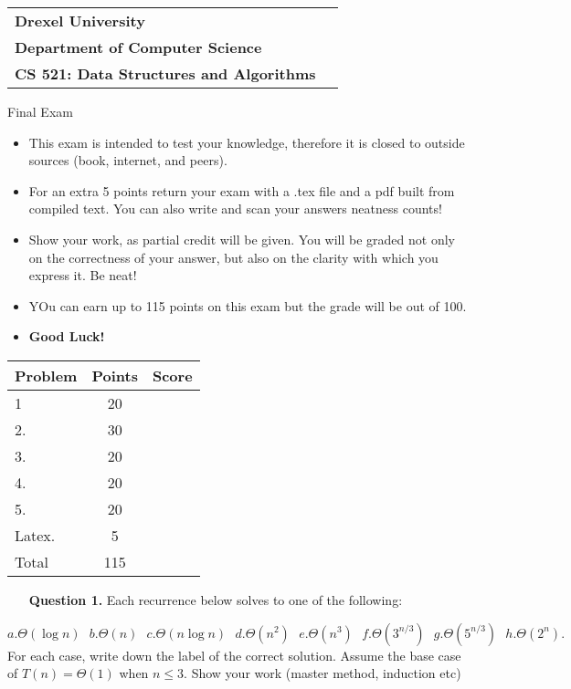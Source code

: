 \documentclass[10pt,letterpaper]{article}
\begin{document}
\begin{tabular}{ll}
{\bf Drexel University}  \\
{\bf Department of Computer Science } \\
{\bf CS 521: Data Structures and Algorithms}& \hspace{1in}{\it Summer 2022} \\
\hline
\end{tabular}
\vspace{0.75 in}
\begin{center}
\begin{LARGE}{Final  Exam} \end{LARGE}
\end{center}
\vspace{0.5in }
\begin{itemize}
\item This exam is intended to test your knowledge, therefore it is closed to outside sources (book, internet, and peers).
\item For an extra 5 points return your exam with a .tex file and a pdf built from compiled text. You can also write and scan your answers neatness counts!
\item Show  your work, as  partial credit will  be given. You  will be
  graded not only on the correctness of your answer, but also on the
  clarity with which you express it. Be neat!
\item YOu can earn up to 115 points on this exam but the grade will be out of 100.
\item {\large \bf Good Luck!}
\end{itemize}
\begin{center}
\begin{tabular}{||l|c|c||}
\hline
\hline
{\sc Problem} & {\sc Points} & {\sc Score}\\
\hline
\hline
{1} & 20 & \\
\hline
{2.} & 30 & \\
\hline
{3.} & 20 & \\
\hline
{4.} & 20 & \\
\hline
{5.} & 20 & \\
\hline
{Latex.} & 5 & \\
\hline
\hline
{\sc Total} & 115 & \\
\hline
\hline
\end{tabular}
\end{center}
\newpage



\begin{itemize}
\item[{\bf Question 1.}] Each recurrence below solves to one of the following:
\end{itemize}
$$ a.\Theta(\log n) \ \ \ b.\Theta(n)\ \ \ c.\Theta(n\log n)\ \ \
d.\Theta(n^2)\ \ \ e.\Theta(n^3) \ \ \ f.\Theta(3^{n/3})\ \ \
g.\Theta(5^{n/3})\ \ \ h.\Theta(2^{n}).$$
For each case, write down the label of the correct solution. Assume
the base case of  $T (n) = \Theta(1)$ when $n \le 3$. Show your work (master method, induction etc) \\ 
\end{document}
